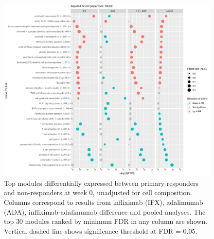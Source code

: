 
\begin{figure}
    \centering
    \includegraphics[width=1.0\textwidth,page=1]{mainmatter/figures/chapter_04/plot_gene_set_enrichment.tmodCERNO_panelplot_reversed_C_1RI_1NI,C_1RA_1NA,C_(1RI_1NI)_(1RA_1NA),C_1R_1N.cell_prop_correction_FALSE.pdf}
    \caption{Top modules differentially expressed between primary responders and non-responders at week 0, unadjusted for cell composition. Columns correspond to results from infliximab (IFX), adalimumab (ADA), infliximab-adalimumab difference and pooled analyses. The top 30 modules ranked by minimum \gls{FDR} in any column are shown. Vertical dashed line shows significance threshold at FDR = 0.05.}
    \label{fig:multipants_dge_panelPlot_week_0_R_N_cellPropF}
\end{figure}

